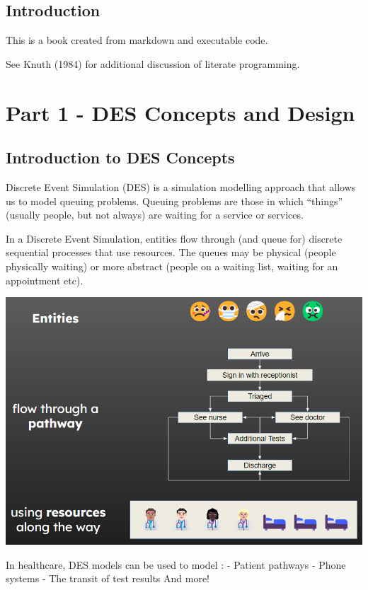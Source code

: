 \documentclass[
  letterpaper,
  DIV=11,
  numbers=noendperiod]{scrreprt}
\begin{document}

\chapter{Introduction}\label{introduction}

This is a book created from markdown and executable code.

See Knuth (1984) for additional discussion of literate programming.

\part{Part 1 - DES Concepts and Design}

\chapter{Introduction to DES
Concepts}\label{introduction-to-des-concepts}

Discrete Event Simulation (DES) is a simulation modelling approach that
allows us to model queuing problems. Queuing problems are those in which
``things'' (usually people, but not always) are waiting for a service or
services.

In a Discrete Event Simulation, entities flow through (and queue for)
discrete sequential processes that use resources. The queues may be
physical (people physically waiting) or more abstract (people on a
waiting list, waiting for an appointment etc).

\includegraphics{images/example.png}

In healthcare, DES models can be used to model : - Patient pathways -
Phone systems - The transit of test results And more!
\end{document}
